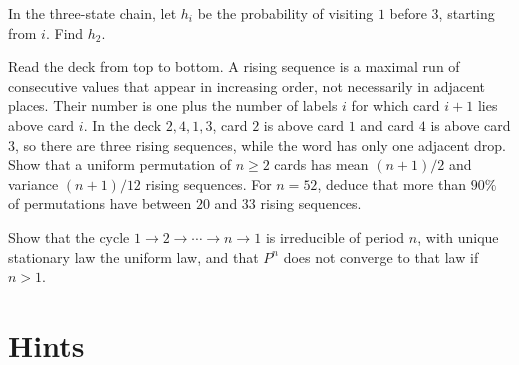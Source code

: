 \begin{exercise}[$\star$]\label{ex:hitbefore}
In the three-state chain, let $h_i$ be the probability of visiting $1$ before $3$, starting from $i$. Find $h_2$.
\end{exercise}

\begin{exercise}[$\star\star$]\label{ex:risingmean}
Read the deck from top to bottom. A rising sequence is a maximal run of consecutive values that appear in increasing order, not necessarily in adjacent places. Their number is one plus the number of labels $i$ for which card $i+1$ lies above card $i$. In the deck $2,4,1,3$, card $2$ is above card $1$ and card $4$ is above card $3$, so there are three rising sequences, while the word has only one adjacent drop. Show that a uniform permutation of $n\ge2$ cards has mean $(n+1)/2$ and variance $(n+1)/12$ rising sequences. For $n=52$, deduce that more than $90\%$ of permutations have between $20$ and $33$ rising sequences.
\end{exercise}

\begin{exercise}[$\star$]\label{ex:period}
Show that the cycle $1\to2\to\cdots\to n\to1$ is irreducible of period $n$, with unique stationary law the uniform law, and that $P^n$ does not converge to that law if $n>1$.
\end{exercise}

\section{Hints}


